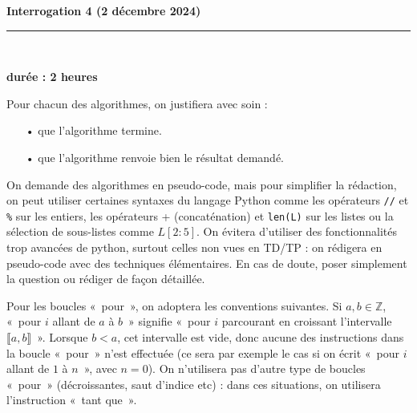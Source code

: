 \documentclass[11pt,a4paper]{article}
\title{}
\date{}
\newcommand{\HRule}{\rule{\linewidth}{0.5mm}}
\begin{document}
\pagestyle{fancy}

\fancyhead{}
 \fancyfoot{}


\newcommand{\lb}{\llbracket}
\newcommand{\rb}{\rrbracket}
\newcommand{\N}{\mathbb{N}}
\newcommand{\Z}{\mathbb{Z}}
\newcommand{\R}{\mathbb{R}}




\newcommand{\md}[3]{#1\ \equiv \ #2 \! \! \! \! \! \pmod {#3} }
\newcommand{\nmd}[3]{#1 \not \equiv #2 \! \! \! \! \!  \pmod {#3} }
\newcommand{\mda}[3]{#1 \equiv #2 \! \!  \pmod {#3} }
\newcommand{\nmda}[3]{#1 \not \equiv #2 \! \! \pmod {#3} }
\newcommand{\mo}[2]{#1 \! \! \! \! \! \pmod #2 }
\newcommand{\moa}[2]{#1 \! \!  \pmod {#2} }

\thispagestyle{fancy}

\begin{center}
    { \huge \bfseries
Interrogation 4 (2 décembre 2024)
     \\ [0cm] }
    \HRule \\[0.5cm]
\end{center}

\begin{center}
\textbf{durée : 2 heures}
\end{center}



Pour chacun des algorithmes, on justifiera avec soin : \begin{itemize}
\item[•] que l'algorithme termine.

\item[•] que l'algorithme renvoie bien le résultat demandé.
\end{itemize}

On demande des algorithmes en pseudo-code, mais pour simplifier la rédaction, on peut utiliser certaines syntaxes du langage Python comme les opérateurs \verb+//+ et \verb+%+ sur les entiers, les opérateurs + (concaténation) et \verb+len(L)+ sur les listes ou la sélection de sous-listes comme $L[2:5]$.
On évitera d'utiliser des fonctionnalités trop avancées de python, surtout celles non vues en TD/TP : on rédigera en pseudo-code avec des techniques élémentaires. En cas de doute, poser simplement la question ou rédiger de façon détaillée.

Pour les boucles «~pour~», on adoptera les conventions suivantes. Si $a,b\in \Z$, «~pour $i$ allant de $a$ à $b$~» signifie «~pour $i$ parcourant en croissant l'intervalle $\llbracket a,b\rrbracket$~». Lorsque $b<a$, cet intervalle est vide, donc aucune des instructions dans la boucle «~pour~» n'est effectuée (ce sera par exemple le cas si on écrit «~pour $i$ allant de $1$ à $n$~», avec $n=0$). On n'utilisera pas d'autre type de boucles «~pour~» (décroissantes, saut d'indice etc) : dans ces situations, on utilisera l'instruction «~tant que~».
\end{document}

